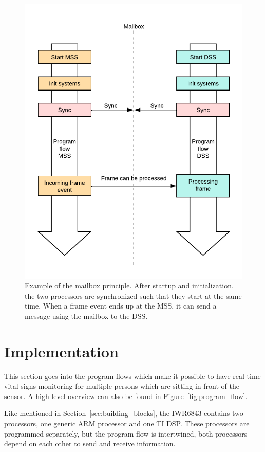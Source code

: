\begin{figure}[t]
\centering
\includegraphics[width=.6\textwidth]{figures/realtime_implementation/Mailbox working principle.pdf}
\caption{Example of the mailbox principle. After startup and initialization, the two processors are synchronized such that they start at the same time. When a frame event ends up at the MSS, it can send a message using the mailbox to the DSS.}
\label{fig:mailbox_principle}
\end{figure}

\section{Implementation}
This section goes into the program flows which make it possible to have real-time vital signs monitoring for multiple persons which are sitting in front of the sensor. A high-level overview can also be found in Figure~\ref{fig:program_flow}.

Like mentioned in Section~\ref{sec:building_blocks}, the IWR6843 contains two processors, one generic ARM processor and one TI DSP. These processors are programmed separately, but the program flow is intertwined, both processors depend on each other to send and receive information. 


